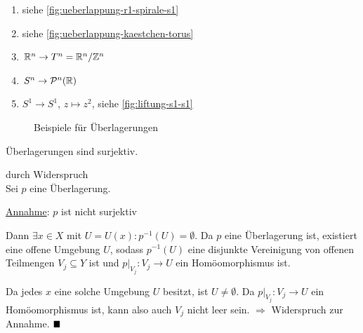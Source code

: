 \begin{beispiel}
    \begin{enumerate}[label=\arabic*)]
        \item siehe \cref{fig:ueberlappung-r1-spirale-s1}
        \item siehe \cref{fig:ueberlappung-kaestchen-torus}
        \item $\mathbb{R}^n \rightarrow T^n = \mathbb{R}^n / \mathbb{Z}^n$
        \item $S^n \rightarrow \mathcal{P}^n(\mathbb{R})$
        \item $S^1 \rightarrow S^1$, $z \mapsto z^2$, siehe \cref{fig:liftung-s1-s1}
    \end{enumerate}

    \begin{figure}[ht]
        \centering
        \label{fig:ueberlagerungen}
        \caption{Beispiele für Überlagerungen}
    \end{figure}
\end{beispiel}

\begin{korollar}
    Überlagerungen sind surjektiv.
\end{korollar}

\begin{beweis}durch Widerspruch\\
    Sei $p$ eine Überlagerung.

    \underline{Annahme}: $p$ ist nicht surjektiv

    Dann $\exists x \in X$ mit $U=U(x): p^{-1}(U) = \emptyset$.
    Da $p$ eine Überlagerung ist, existiert eine offene Umgebung $U$,
    sodass $p^{-1}(U)$ eine disjunkte Vereinigung von offenen Teilmengen
    $V_j \subseteq Y$ ist und $p|_{V_j}: V_j \rightarrow U$ ein
    Homöomorphismus ist.

    Da jedes $x$ eine solche Umgebung $U$ besitzt, ist $U \neq \emptyset$.
    Da $p|_{V_j}: V_j \rightarrow U$ ein Homöomorphismus ist, kann also
    auch $V_j$ nicht leer sein. $\Rightarrow$ Widerspruch zur Annahme.
    $\qed$
\end{beweis}

